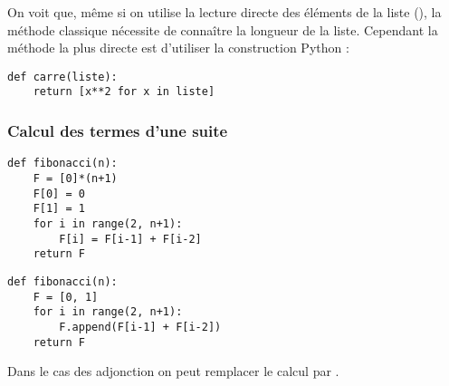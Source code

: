 On voit que, même si on utilise la lecture directe des éléments de la liste (), la méthode classique nécessite de connaître la longueur de la liste. Cependant la méthode la plus directe est d'utiliser la construction Python :
\begin{lstlisting}
def carre(liste):
    return [x**2 for x in liste]
\end{lstlisting}
\subsubsection{Calcul des termes d'une suite}
\begin{multicols}{2}
\setlength{\columnseprule}{1pt}

\begin{lstlisting}[frame=no]
def fibonacci(n):
    F = [0]*(n+1)
    F[0] = 0
    F[1] = 1
    for i in range(2, n+1):
        F[i] = F[i-1] + F[i-2]
    return F
\end{lstlisting}

\columnbreak 

\begin{lstlisting}[frame=no]
def fibonacci(n):
    F = [0, 1]
    for i in range(2, n+1):
        F.append(F[i-1] + F[i-2])
    return F
\end{lstlisting}
\end{multicols}

Dans le cas des adjonction on peut remplacer le calcul par .
